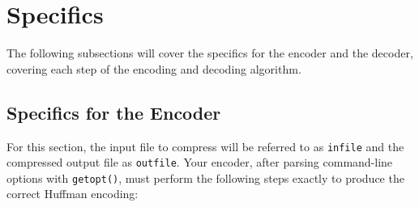 \section{Specifics}

The following subsections will cover the specifics for the encoder and
the decoder, covering each step of the encoding and decoding algorithm.

\subsection{Specifics for the Encoder}\label{encoder_specifics}

For this section, the input file to compress will be referred to as
\texttt{infile} and the compressed output file as \texttt{outfile}. Your
encoder, after parsing command-line options with \texttt{getopt()}, must
perform the following steps exactly to produce the correct Huffman
encoding:

